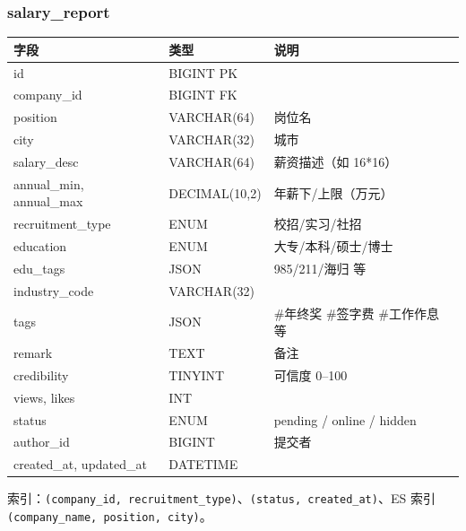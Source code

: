 \documentclass[11pt,a4paper]{ctexart}
\begin{document}
\subsubsection{salary\_report}
\begin{longtable}{p{3.4cm}p{3cm}p{7.6cm}}
\toprule
字段 & 类型 & 说明\\
\midrule
id & BIGINT PK & \\
company\_id & BIGINT FK & \\
position & VARCHAR(64) & 岗位名\\
city & VARCHAR(32) & 城市\\
salary\_desc & VARCHAR(64) & 薪资描述（如 16*16）\\
annual\_min, annual\_max & DECIMAL(10,2) & 年薪下/上限（万元）\\
recruitment\_type & ENUM & 校招/实习/社招\\
education & ENUM & 大专/本科/硕士/博士\\
edu\_tags & JSON & 985/211/海归 等\\
industry\_code & VARCHAR(32) & \\
tags & JSON & \#年终奖 \#签字费 \#工作作息 等\\
remark & TEXT & 备注\\
credibility & TINYINT & 可信度 0--100\\
views, likes & INT & \\
status & ENUM & pending / online / hidden\\
author\_id & BIGINT & 提交者\\
created\_at, updated\_at & DATETIME & \\
\bottomrule
\end{longtable}
索引：\texttt{(company\_id, recruitment\_type)}、\texttt{(status, created\_at)}、ES 索引 \texttt{(company\_name, position, city)}。
\end{document}
